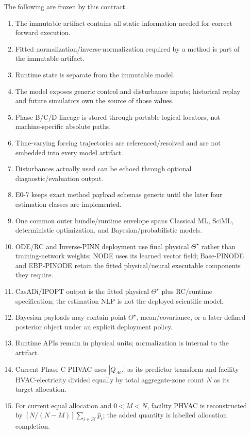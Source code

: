 \documentclass[11pt]{article}
\begin{document}
The following are frozen by this contract.
\begin{enumerate}[leftmargin=1.8em]
\item The immutable artifact contains all static information needed for correct forward execution.
\item Fitted normalization/inverse-normalization required by a method is part of the immutable artifact.
\item Runtime state is separate from the immutable model.
\item The model exposes generic control and disturbance inputs; historical replay and future simulators own the source of those values.
\item Phase-B/C/D lineage is stored through portable logical locators, not machine-specific absolute paths.
\item Time-varying forcing trajectories are referenced/resolved and are not embedded into every model artifact.
\item Disturbances actually used can be echoed through optional diagnostic/evaluation output.
\item E0-7 keeps exact method payload schemas generic until the later four estimation classes are implemented.
\item One common outer bundle/runtime envelope spans Classical ML, SciML, deterministic optimization, and Bayesian/probabilistic models.
\item ODE/RC and Inverse-PINN deployment use final physical $\Theta^\star$ rather than training-network weights; NODE uses its learned vector field; Base-PINODE and EBP-PINODE retain the fitted physical/neural executable components they require.
\item CasADi/IPOPT output is the fitted physical $\Theta^\star$ plus RC/runtime specification; the estimation NLP is not the deployed scientific model.
\item Bayesian payloads may contain point $\Theta^\star$, mean/covariance, or a later-defined posterior object under an explicit deployment policy.
\item Runtime APIs remain in physical units; normalization is internal to the artifact.
\item Current Phase-C PHVAC uses $|Q_{AC}|$ as its predictor transform and facility-HVAC-electricity divided equally by total aggregate-zone count $N$ as its target allocation.
\item For current equal allocation and $0<M<N$, facility PHVAC is reconstructed by $[N/(N-M)]\sum_{i\in\mathcal H}\hat p_i$; the added quantity is labelled allocation completion.

\end{enumerate}
\end{document}
